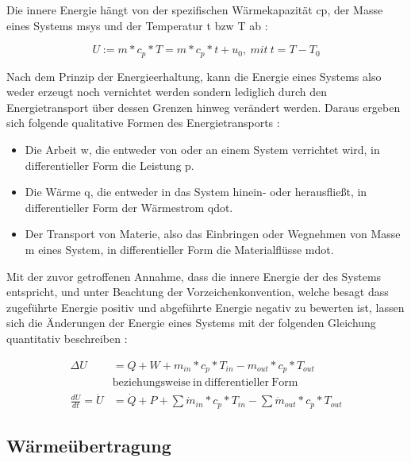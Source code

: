 Die innere Energie hängt von der spezifischen Wärmekapazität \gls{cp}, der Masse eines Systems \gls{msys} und der Temperatur \gls{t} \acrlong{bzw} \gls{T} ab \cite[S.~54]{ba12}:

\begin{equation}
\label{eq:innereenergie}
U := m*c_p*T=m*c_p*t+u_0,~mit~t=T-T_0
\end{equation}

Nach dem Prinzip der Energieerhaltung, kann die Energie eines Systems also weder erzeugt noch vernichtet werden sondern lediglich durch den Energietransport über dessen Grenzen hinweg verändert werden. Daraus ergeben sich folgende qualitative Formen des Energietransports \cite[S.~48f.]{ba12}:

\begin{itemize}
	\item Die Arbeit \gls{w}, die entweder von oder an einem System verrichtet wird, in differentieller Form die Leistung \gls{p}.
	\item Die Wärme \gls{q}, die entweder in das System hinein- oder herausfließt, in differentieller Form der Wärmestrom \gls{qdot}.
	\item Der Transport von Materie, also das Einbringen oder Wegnehmen von Masse \gls{m} eines System, in differentieller Form die Materialflüsse \gls{mdot}.
\end{itemize}

Mit der zuvor getroffenen Annahme, dass die innere Energie der des Systems entspricht, und unter Beachtung der Vorzeichenkonvention, welche besagt dass zugeführte Energie positiv und abgeführte Energie negativ zu bewerten ist, lassen sich die Änderungen der Energie eines Systems mit der folgenden Gleichung quantitativ beschreiben \cite[S.~54]{ba12}:

\begin{equation}
\label{eq:hauptsatz}
\begin{split}
\Delta U & = Q + W + m_{in}*c_{p}*T_{in}-m_{out}*c_{p}*T_{out} \\ ~& \mathrm{beziehungsweise~in~differentieller~Form}\\
\frac{dU}{dt}=\dot{U} & =\dot{Q}+P+\sum\dot{m}_{in}*c_{p}*T_{in}-\sum\dot{m}_{out}*c_{p}*T_{out}
\end{split}
\end{equation}



\subsection{Wärmeübertragung}

